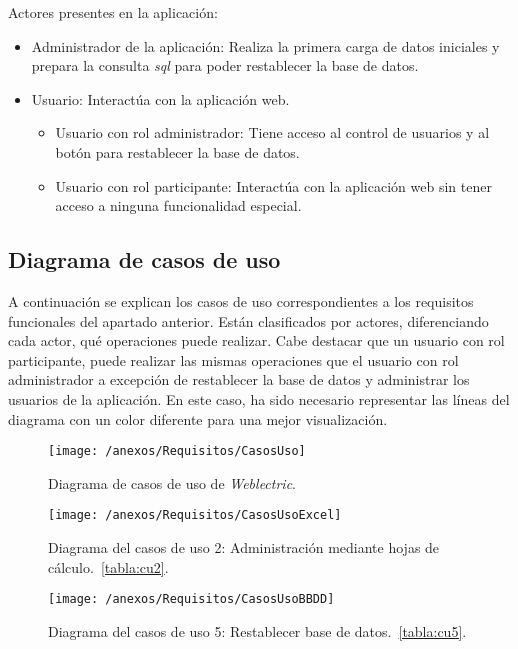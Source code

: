 Actores presentes en la aplicación:

\begin{itemize}
	\item Administrador de la aplicación: Realiza la primera carga de datos iniciales y prepara la consulta \textit{sql} para poder restablecer la base de datos.
	\item Usuario: Interactúa con la aplicación web.
	\begin{itemize}
		\item Usuario con rol administrador: Tiene acceso al control de usuarios y al botón para restablecer la base de datos.
		\item Usuario con rol participante: Interactúa con la aplicación web sin tener acceso a ninguna funcionalidad especial.
	\end{itemize}
\end{itemize}

\subsection{Diagrama de casos de uso}

A continuación se explican los casos de uso correspondientes a los requisitos funcionales del apartado anterior.
Están clasificados por actores, diferenciando cada actor, qué operaciones puede realizar. Cabe destacar que un usuario con rol participante, puede realizar las mismas operaciones que el usuario con rol administrador a excepción de restablecer la base de datos y administrar los usuarios de la aplicación. En este caso, ha sido necesario representar las líneas del diagrama con un color diferente para una mejor visualización.

\begin{figure}[h]
	\centering
	\texttt{[image: /anexos/Requisitos/CasosUso]}
	\caption{Diagrama de casos de uso de \textit{Weblectric}.}
	\label{fig:casosUso}
\end{figure}

\begin{figure}[h]
	\centering
	\texttt{[image: /anexos/Requisitos/CasosUsoExcel]}
	\caption{Diagrama del casos de uso 2: Administración mediante hojas de cálculo.~\ref{tabla:cu2}.}
	\label{fig:casosUsoExcel}
\end{figure}

\begin{figure}[h]
	\centering
	\texttt{[image: /anexos/Requisitos/CasosUsoBBDD]}
	\caption{Diagrama del casos de uso 5: Restablecer base de datos.~\ref{tabla:cu5}.}
	\label{fig:CasosUsoBBDD}
\end{figure}

